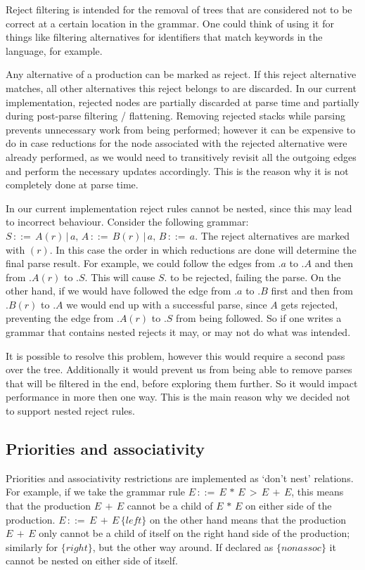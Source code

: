 \documentclass[a4paper,10pt]{article}
\begin{document}
Reject filtering is intended for the removal of trees that are considered not to be correct at a certain location in the grammar. One could think of using it for things like filtering alternatives for identifiers that match keywords in the language, for example.

Any alternative of a production can be marked as reject. If this reject alternative matches, all other alternatives this reject belongs to are discarded. In our current implementation, rejected nodes are partially discarded at parse time and partially during post-parse filtering / flattening. Removing rejected stacks while parsing prevents unnecessary work from being performed; however it can be expensive to do in case reductions for the node associated with the rejected alternative were already performed, as we would need to transitively revisit all the outgoing edges and perform the necessary updates accordingly. This is the reason why it is not completely done at parse time.

In our current implementation reject rules cannot be nested, since this may lead to incorrect behaviour. Consider the following grammar: $S\,::=\,A(r)\,|\,a,\,A\,::=\,B(r)\,|\,a,\,B\,::=\,a$. The reject alternatives are marked with $(r)$. In this case the order in which reductions are done will determine the final parse result. For example, we could follow the edges from $.a$ to $.A$ and then from $.A(r)$ to $.S$. This will cause $S.$ to be rejected, failing the parse. On the other hand, if we would have followed the edge from $.a$ to $.B$ first and then from $.B(r)$ to $.A$ we would end up with a successful parse, since $A$ gets rejected, preventing the edge from $.A(r)$ to $.S$ from being followed. So if one writes a grammar that contains nested rejects it may, or may not do what was intended.

It is possible to resolve this problem, however this would require a second pass over the tree. Additionally it would prevent us from being able to remove parses that will be filtered in the end, before exploring them further. So it would impact performance in more then one way. This is the main reason why we decided not to support nested reject rules.

\subsection{Priorities and associativity}

Priorities and associativity restrictions are implemented as `don't nest' relations. For example, if we take the grammar rule $E\,::=\,E\,*\,E\,>\,E\,+\,E$, this means that the production $E\,+\,E$ cannot be a child of $E\,*\,E$ on either side of the production. $E\,::=\,E\,+\,E\,\{left\}$ on the other hand means that the production $E\,+\,E$ only cannot be a child of itself on the right hand side of the production; similarly for $\{right\}$, but the other way around. If declared as $\{nonassoc\}$ it cannot be nested on either side of itself.
\end{document}
